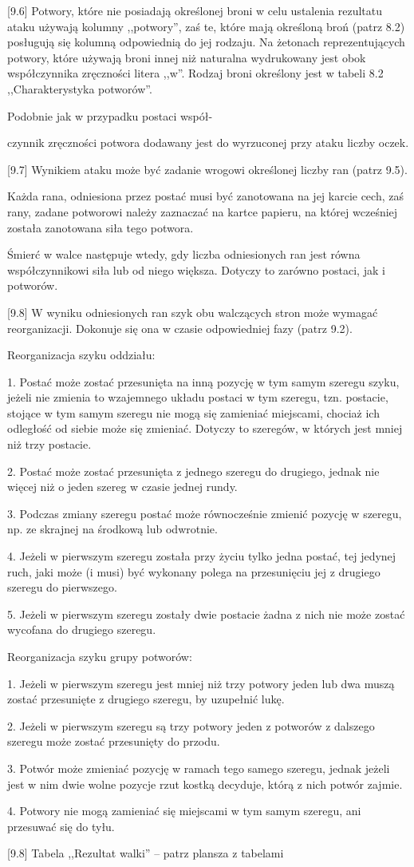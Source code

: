 [9.6] Potwory, które nie posiadają określonej broni w celu ustalenia rezultatu ataku używają kolumny ,,potwory'', zaś te, które mają określoną broń (patrz 8.2) posługują się kolumną odpowiednią do jej rodzaju.
Na żetonach reprezentujących potwory, które używają broni innej niż naturalna wydrukowany jest obok współczynnika zręczności litera ,,w''.
Rodzaj broni określony jest w tabeli 8.2 ,,Charakterystyka potworów''.

Podobnie jak w przypadku postaci współ-

czynnik zręczności potwora dodawany jest do wyrzuconej przy ataku liczby oczek.

[9.7] Wynikiem ataku może być zadanie wrogowi określonej liczby ran (patrz 9.5).

Każda rana, odniesiona przez postać musi być zanotowana na jej karcie cech, zaś rany, zadane potworowi należy zaznaczać na kartce papieru, na której wcześniej została zanotowana siła tego potwora.

Śmierć w walce następuje wtedy, gdy liczba odniesionych ran jest równa współczynnikowi siła lub od niego większa.
Dotyczy to zarówno postaci, jak i potworów.

[9.8] W wyniku odniesionych ran szyk obu walczących stron może wymagać reorganizacji.
Dokonuje się ona w czasie odpowiedniej fazy (patrz 9.2).

Reorganizacja szyku oddziału:

1.
Postać może zostać przesunięta na inną pozycję w tym samym szeregu szyku, jeżeli nie zmienia to wzajemnego układu postaci w tym szeregu, tzn. postacie, stojące w tym samym szeregu nie mogą się zamieniać miejscami, chociaż ich odległość od siebie może się zmieniać.
Dotyczy to szeregów, w których jest mniej niż trzy postacie.

2.
Postać może zostać przesunięta z jednego szeregu do drugiego, jednak nie więcej niż o jeden szereg w czasie jednej rundy.

3.
Podczas zmiany szeregu postać może równocześnie zmienić pozycję w szeregu, np. ze skrajnej na środkową lub odwrotnie.

4.
Jeżeli w pierwszym szeregu została przy życiu tylko jedna postać, tej jedynej ruch, jaki może (i musi) być wykonany polega na przesunięciu jej z drugiego szeregu do pierwszego.

5.
Jeżeli w pierwszym szeregu zostały dwie postacie żadna z nich nie może zostać wycofana do drugiego szeregu.

Reorganizacja szyku grupy potworów:

1.
Jeżeli w pierwszym szeregu jest mniej niż trzy potwory jeden lub dwa muszą zostać przesunięte z drugiego szeregu, by uzupełnić lukę.

2.
Jeżeli w pierwszym szeregu są trzy potwory jeden z potworów z dalszego szeregu może zostać przesunięty do przodu.

3.
Potwór może zmieniać pozycję w ramach tego samego szeregu, jednak jeżeli jest w nim dwie wolne pozycje rzut kostką decyduje, którą z nich potwór zajmie.

4.
Potwory nie mogą zamieniać się miejscami w tym samym szeregu, ani przesuwać się do tyłu.

[9.8] Tabela ,,Rezultat walki'' – patrz plansza z tabelami